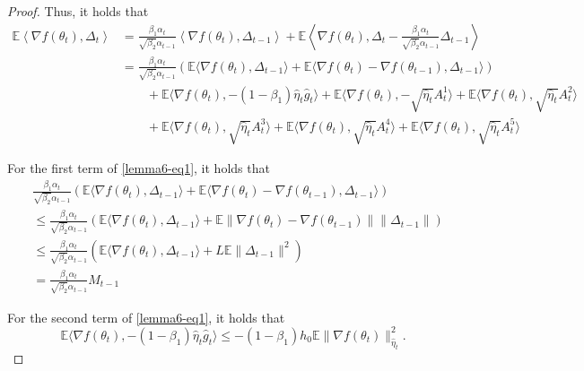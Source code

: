 \begin{proof}
Thus, it holds that
\begin{equation}
\label{lemma6-eq1}
\begin{split}
    \mathbb{E} \left\langle \nabla f(\theta_t),\Delta_t\right\rangle & = \frac{\beta_1\alpha_t}{\sqrt{\beta_2}\alpha_{t-1}} \left\langle \nabla f(\theta_t),\Delta_{t-1}\right\rangle + \mathbb{E} \left\langle \nabla f(\theta_t), \Delta_t - \frac{\beta_1\alpha_t}{\sqrt{\beta_2}\alpha_{t-1}}\Delta_{t-1}\right\rangle\\
    &=\frac{\beta_1\alpha_t}{\sqrt{\beta_2}\alpha_{t-1}}\left(\mathbb{E}\langle \nabla f(\theta_t), \Delta_{t-1}\rangle + \mathbb{E}\langle \nabla f(\theta_{t}) - \nabla f(\theta_{t-1}),\Delta_{t-1}\rangle \right)\\
    &\qquad  + \mathbb{E} \langle \nabla f(\theta_t), -(1-\beta_1) \hat{\eta}_t \hat{g}_t\rangle + \mathbb{E} \langle \nabla f(\theta_t), -\sqrt{\hat{\eta}_t}A_t^1\rangle+ \mathbb{E} \langle \nabla f(\theta_t), \sqrt{\hat{\eta}_t}A_t^2\rangle\\
    &\qquad + \mathbb{E} \langle \nabla f(\theta_t), \sqrt{\hat{\eta}_t}A_t^3\rangle + \mathbb{E} \langle \nabla f(\theta_t), \sqrt{\hat{\eta}_t}A_t^4\rangle+ \mathbb{E} \langle \nabla f(\theta_t), \sqrt{\hat{\eta}_t}A_t^5\rangle 
\end{split}
\end{equation}

For the first term of \eqref{lemma6-eq1}, it holds that
\[
\begin{split}
    &\frac{\beta_1\alpha_t}{\sqrt{\beta_2}\alpha_{t-1}}\left(\mathbb{E}\langle \nabla f(\theta_t), \Delta_{t-1}\rangle + \mathbb{E}\langle \nabla f(\theta_{t}) - \nabla f(\theta_{t-1}),\Delta_{t-1}\rangle \right)\\
    &\leq \frac{\beta_1\alpha_t}{\sqrt{\beta_2}\alpha_{t-1}}\left(\mathbb{E}\langle \nabla f(\theta_t), \Delta_{t-1}\rangle + \mathbb{E}\|\nabla f(\theta_{t}) - \nabla f(\theta_{t-1})\|\|\Delta_{t-1}\| \right)\\
    &\leq \frac{\beta_1\alpha_t}{\sqrt{\beta_2}\alpha_{t-1}}\left(\mathbb{E}\langle \nabla f(\theta_t), \Delta_{t-1}\rangle + L\mathbb{E} \|\Delta_{t-1}\|^2 \right)\\
    & = \frac{\beta_1\alpha_t}{\sqrt{\beta_2}\alpha_{t-1}}M_{t-1}
\end{split}
\]

For the second term of \eqref{lemma6-eq1}, it holds that
\[
\mathbb{E} \langle \nabla f(\theta_t), -(1-\beta_1) \hat{\eta}_t \hat{g}_t\rangle \leq -(1-\beta_1) h_0 \mathbb{E} \|\nabla f(\theta_t)\|_{\hat{\eta}_t}^2.
\]



\end{proof}
